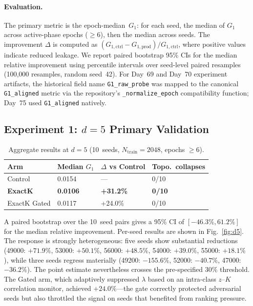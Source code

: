 \paragraph{Evaluation.} The primary metric is the epoch-median~$G_1$: for each seed, the median of $G_1$ across active-phase epochs ($\geq 6$), then the median across seeds. The improvement $\Delta$ is computed as $(G_{1,\text{ctrl}} - G_{1,\text{prod}}) / G_{1,\text{ctrl}}$, where positive values indicate reduced leakage. We report paired bootstrap 95\% CIs for the median relative improvement using percentile intervals over seed-level paired resamples (100,000 resamples, random seed~42). For Day~69 and Day~70 experiment artifacts, the historical field name \texttt{G1\_raw\_probe} was mapped to the canonical \texttt{G1\_aligned} metric via the repository's \texttt{\_normalize\_epoch} compatibility function; Day~75 used \texttt{G1\_aligned} natively.

\subsection{Experiment 1: $d{=}5$ Primary Validation}

\begin{table}[htbp]
\caption{Aggregate results at $d{=}5$ (10~seeds, $N_{\text{train}}{=}2048$, epochs $\geq 6$).}
\label{tab:d5}
\begin{ruledtabular}
\begin{tabular}{llll}
Arm & Median $G_1$ & $\Delta$ vs Control & Topo.\ collapses \\
\hline
Control & 0.0154 & --- & 0/10 \\
\textbf{ExactK} & \textbf{0.0106} & \textbf{+31.2\%} & \textbf{0/10} \\
ExactK Gated & 0.0117 & +24.0\% & 0/10 \\
\end{tabular}
\end{ruledtabular}
\end{table}

A paired bootstrap over the 10~seed pairs gives a 95\% CI of $[-46.3\%, 61.2\%]$ for the median relative improvement. Per-seed results are shown in Fig.~\ref{fig:d5}. The response is strongly heterogeneous: five seeds show substantial reductions (49000: $+71.9\%$, 53000: $+50.1\%$, 56000: $+48.5\%$, 54000: $+39.0\%$, 55000: $+18.1\%$), while three seeds regress materially (49200: $-155.6\%$, 52000: $-40.7\%$, 47000: $-36.2\%$). The point estimate nevertheless crosses the pre-specified $30\%$ threshold. The Gated arm, which adaptively suppressed $\lambda$ based on an intra-class $z$--$K$ correlation monitor, achieved $+24.0\%$---the gate correctly protected adversarial seeds but also throttled the signal on seeds that benefited from ranking pressure.

